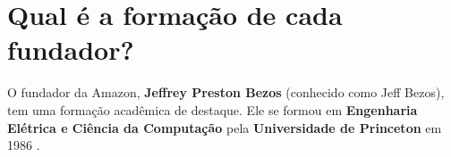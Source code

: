 \section{Qual é a formação de cada fundador?}

O fundador da Amazon, \textbf{Jeffrey Preston Bezos} (conhecido como Jeff Bezos), tem uma formação acadêmica de destaque. Ele se formou em \textbf{Engenharia Elétrica e Ciência da Computação} pela \textbf{Universidade de Princeton} em 1986 \cite{leverageedu2024}.

